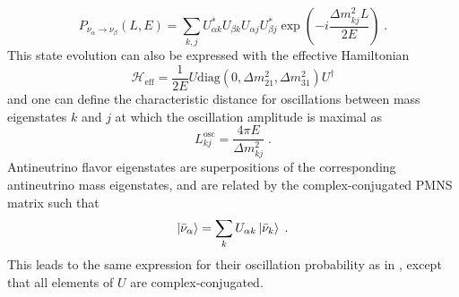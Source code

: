 \begin{equation}
    P_{\nu_\alpha \rightarrow \nu_\beta}(L,E) = \sum_{k,j}U^*_{\alpha k}U_{\beta k}U_{\alpha j}U_{\beta j}^* \exp(-i\frac{\Delta m_{kj}^2 L}{2E})\;.\label{eq:vac-oscprob}
\end{equation}
This state evolution can also be expressed with the effective Hamiltonian
\begin{equation}
    \mathcal{H}_\mathrm{eff} = \frac{1}{2E}U\mathrm{diag}(0,\Delta m_{21}^2, \Delta m_{31}^2)U^\dag
\end{equation}
and one can define the characteristic distance for oscillations between mass eigenstates $k$ and $j$ at which the oscillation amplitude is maximal as
\begin{equation}
    L_{kj}^\mathrm{osc} = \frac{4\pi E}{\Delta m_{kj}^2}\;.
\end{equation}
Antineutrino flavor eigenstates are superpositions of the corresponding antineutrino mass eigenstates, and are related by the complex-conjugated PMNS matrix such that
\begin{equation}
    \ket{\bar{\nu}_\alpha} = \sum_k U_{\alpha k}\ket{\bar{\nu}_k}\;.\label{eq:flavor-state-def-antinu}
\end{equation}
This leads to the same expression for their oscillation probability as in , except that all elements of $U$ are complex-conjugated. 

